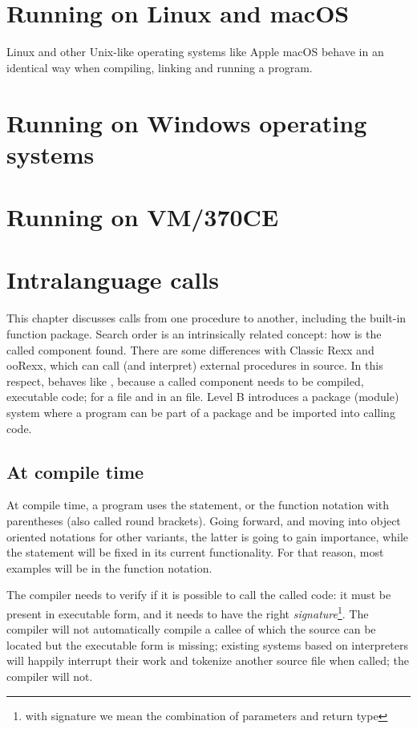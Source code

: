 \chapter{Running \crexx{} on Linux and macOS}
Linux and other Unix-like operating systems like Apple macOS behave in
an identical way when compiling, linking and running a \crexx{}
program.

\chapter{Running \crexx{} on Windows operating systems}
\chapter{Running \crexx{} on VM/370CE}
\chapter{Intralanguage calls}
This chapter discusses calls from one \crexx{} procedure to another,
including the built-in function package. Search order is an
intrinsically related concept: how is the called component found. There
are some differences with Classic Rexx and ooRexx, which can call (and interpret)
external procedures in source. In this respect, \crexx{} behaves like
\nr{}, because a called component needs to be compiled, executable
code; for \nr{} a  file and in \crexx{} an 
file. Level B introduces a package (module) system where a program can
be part of a package and be imported into calling code.
\section{At compile time}
At compile time, a program uses the  statement, or the
function notation with parentheses (also called round brackets). Going
forward, and moving into object oriented notations for other \rexx{}
variants, the latter is going to gain importance, while the
 statement will be fixed in its current functionality. For
that reason, most examples will be in the function notation.

The compiler needs to verify if it is possible to call the called
code: it must be present in executable form, and it needs to have the right
\emph{signature}\footnote{with signature we mean the combination of
  parameters and return type}. The compiler will not automatically compile a callee
of which the source can be located but the executable form is missing;
existing systems based on interpreters will happily interrupt their
work and tokenize another source file when called; the \crexx{}
 compiler will not.

